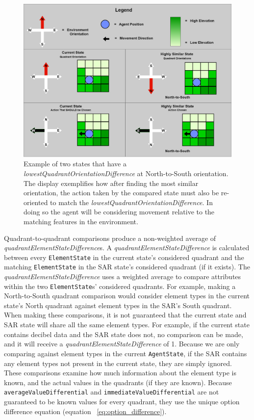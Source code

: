 \begin{figure}[H]
  \includegraphics[width=1.0\columnwidth]{Figures/oriented_movement_example.png}
  \caption{Example of two states that have a \textit{lowestQuadrantOrientationDifference} at North-to-South orientation. The display exemplifies how after finding the most similar orientation, the action taken by the compared state must also be re-oriented to match the \textit{lowestQuadrantOrientationDifference}. In doing so the agent will be considering movement relative to the matching features in the environment.}
  \label{fig:oriented_movement_example}
\end{figure}

Quadrant-to-quadrant comparisons produce a non-weighted average of \textit{quadrantElementStateDifference}s.
A \textit{quadrantElementStateDifference} is calculated between every \texttt{ElementState} in the current state's considered quadrant and the matching \texttt{ElementState} in the SAR state's considered quadrant (if it exists).
The \textit{quadrantElementStateDifference} uses a weighted average to compare attributes within the two \texttt{ElementState}s' considered quadrants.
For example, making a North-to-South quadrant comparison would consider element types in the current state's North quadrant against element types in the SAR's South quadrant.
When making these comparisons, it is not guaranteed that the current state and SAR state will share all the same element types.
For example, if the current state contains decibel data and the SAR state does not, no comparison can be made, and it will receive a \textit{quadrantElementStateDifference} of 1.
Because we are only comparing against element types in the current \texttt{AgentState}, if the SAR contains any element types not present in the current state, they are simply ignored.
These comparisons examine how much information about the element type is known, and the actual values in the quadrants (if they are known).
Because \texttt{averageValueDifferential} and \texttt{immediateValueDifferential} are not guaranteed to be known values for every quadrant, they use the unique option difference equation (equation ~\ref{eq:option_difference}).


